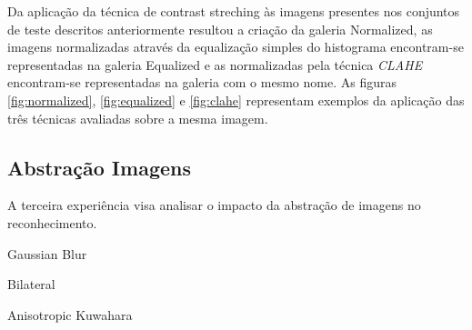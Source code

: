 Da aplicação da técnica de contrast streching às imagens presentes nos conjuntos de teste descritos anteriormente resultou a criação da galeria Normalized, as imagens normalizadas através da equalização simples do histograma encontram-se representadas na galeria Equalized e as normalizadas pela técnica \textit{CLAHE} encontram-se representadas na galeria com o mesmo nome. As figuras \ref{fig:normalized}, \ref{fig:equalized} e \ref{fig:clahe} representam exemplos da aplicação das três técnicas avaliadas sobre a mesma imagem.

\subsection{Abstração Imagens}
A terceira experiência visa analisar o impacto da abstração de imagens no reconhecimento.

Gaussian Blur

Bilateral

Anisotropic Kuwahara

